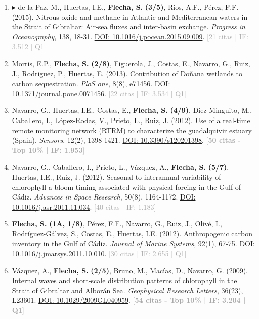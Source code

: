 \documentclass[11pt,a4paper]{article}
\begin{document}
\begin{enumerate}[leftmargin=*]
\item $\blacktriangleright$ de la Paz, M., Huertas, I.E., \textbf{Flecha, S.} \textbf{(3/5)}, Ríos, A.F., Pérez, F.F. (2015). Nitrous oxide and methane in Atlantic and Mediterranean waters in the Strait of Gibraltar: Air-sea fluxes and inter-basin exchange. \textit{Progress in Oceanography}, 138, 18-31. \href{https://doi.org/10.1016/j.pocean.2015.09.009}{DOI: 10.1016/j.pocean.2015.09.009}. \textcolor{darkgray}{\small [21 citas | IF: 3.512 | Q1]}

\item Morris, E.P., \textbf{Flecha, S.} \textbf{(2/8)}, Figuerola, J., Costas, E., Navarro, G., Ruiz, J., Rodriguez, P., Huertas, E. (2013). Contribution of Doñana wetlands to carbon sequestration. \textit{PloS one}, 8(8), e71456. \href{https://doi.org/10.1371/journal.pone.0071456}{DOI: 10.1371/journal.pone.0071456}. \textcolor{darkgray}{\small [22 citas | IF: 3.534 | Q1]}

\item Navarro, G., Huertas, I.E., Costas, E., \textbf{Flecha, S.} \textbf{(4/9)}, Díez-Minguito, M., Caballero, I., López-Rodas, V., Prieto, L., Ruiz, J. (2012). Use of a real-time remote monitoring network (RTRM) to characterize the guadalquivir estuary (Spain). \textit{Sensors}, 12(2), 1398-1421. \href{https://doi.org/10.3390/s120201398}{DOI: 10.3390/s120201398}. \textcolor{darkgray}{\small [\textbf{50 citas - Top 10\% | IF: 1.953}]}

\item Navarro, G., Caballero, I., Prieto, L., Vázquez, A., \textbf{Flecha, S.} \textbf{(5/7)}, Huertas, I.E., Ruiz, J. (2012). Seasonal-to-interannual variability of chlorophyll-a bloom timing associated with physical forcing in the Gulf of Cádiz. \textit{Advances in Space Research}, 50(8), 1164-1172. \href{https://doi.org/10.1016/j.asr.2011.11.034}{DOI: 10.1016/j.asr.2011.11.034}. \textcolor{darkgray}{\small [40 citas | IF: 1.183]}

\item \textbf{Flecha, S.} \textbf{(1A, 1/8)}, Pérez, F.F., Navarro, G., Ruiz, J., Olivé, I., Rodríguez-Gálvez, S., Costas, E., Huertas, I.E. (2012). Anthropogenic carbon inventory in the Gulf of Cádiz. \textit{Journal of Marine Systems}, 92(1), 67-75. \href{https://doi.org/10.1016/j.jmarsys.2011.10.010}{DOI: 10.1016/j.jmarsys.2011.10.010}. \textcolor{darkgray}{\small [30 citas | IF: 2.655 | Q1]}

\item Vázquez, A., \textbf{Flecha, S.} \textbf{(2/5)}, Bruno, M., Macías, D., Navarro, G. (2009). Internal waves and short-scale distribution patterns of chlorophyll in the Strait of Gibraltar and Alborán Sea. \textit{Geophysical Research Letters}, 36(23), L23601. \href{https://doi.org/10.1029/2009GL040959}{DOI: 10.1029/2009GL040959}. \textcolor{darkgray}{\small [\textbf{54 citas - Top 10\% | IF: 3.204 | Q1}]}

\end{enumerate}
\end{document}
